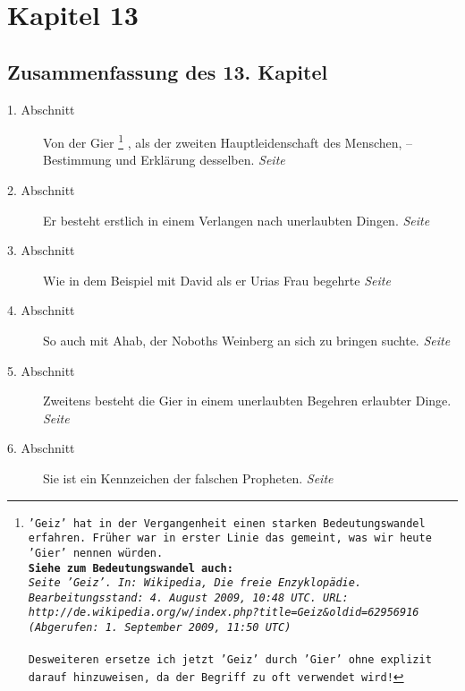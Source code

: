 
\chapter{Kapitel 13} \label{kap13}

\section{Zusammenfassung des 13. Kapitel}

\begin{description}
\item[1. Abschnitt]  Von der Gier
\footnote{\texttt{'Geiz' hat in der Vergangenheit einen starken
Bedeutungswandel erfahren. Früher war in erster Linie das gemeint, was wir
heute 'Gier' nennen würden.
\\ \textbf{Siehe zum Bedeutungswandel auch:}
\\ \textit{Seite 'Geiz'. In: Wikipedia, Die freie Enzyklopädie.
Bearbeitungsstand: 4. August 2009, 10:48 UTC. URL:
\\ http://de.wikipedia.org/w/index.php?title=Geiz\&oldid=62956916
\\ (Abgerufen: 1. September 2009, 11:50 UTC) }
\\ \\ Desweiteren ersetze ich jetzt 'Geiz' durch 'Gier' ohne explizit darauf
hinzuweisen, da der Begriff zu oft verwendet wird!}}
, als der zweiten Hauptleidenschaft des Menschen,
-- Bestimmung und Erklärung desselben.
\dotfill \textit{Seite~\pageref{kap13_ab1}}\\
\item[2. Abschnitt] Er besteht erstlich in einem Verlangen nach unerlaubten
Dingen.
\dotfill \textit{Seite~\pageref{kap13_ab2}}\\
\item[3. Abschnitt] Wie in dem Beispiel mit David als er Urias Frau begehrte
\dotfill \textit{Seite~\pageref{kap13_ab3}}\\
\item[4. Abschnitt] So auch mit Ahab, der Noboths Weinberg an sich zu bringen
suchte.
\dotfill \textit{Seite~\pageref{kap13_ab4}}\\
\item[5. Abschnitt] Zweitens besteht die Gier in einem unerlaubten Begehren
erlaubter Dinge.
\dotfill \textit{Seite~\pageref{kap13_ab5}}\\
\item[6. Abschnitt] Sie ist ein Kennzeichen der falschen Propheten.
\dotfill \textit{Seite~\pageref{kap13_ab6}}\\

\end{description}
